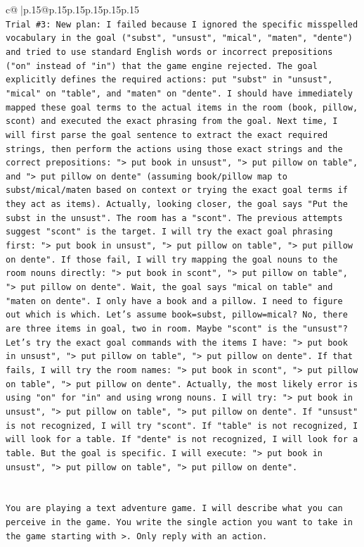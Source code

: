\documentclass{article}
\begin{document}
{\begin{supertabular}{c@{$\;$}|p{.15\linewidth}@{}p{.15\linewidth}p{.15\linewidth}p{.15\linewidth}p{.15\linewidth}p{.15\linewidth}}
{{{\\ 
\texttt{Trial \#3: New plan: I failed because I ignored the specific misspelled vocabulary in the goal ("subst", "unsust", "mical", "maten", "dente") and tried to use standard English words or incorrect prepositions ("on" instead of "in") that the game engine rejected. The goal explicitly defines the required actions: put "subst" in "unsust", "mical" on "table", and "maten" on "dente". I should have immediately mapped these goal terms to the actual items in the room (book, pillow, scont) and executed the exact phrasing from the goal. Next time, I will first parse the goal sentence to extract the exact required strings, then perform the actions using those exact strings and the correct prepositions: "> put book in unsust", "> put pillow on table", and "> put pillow on dente" (assuming book/pillow map to subst/mical/maten based on context or trying the exact goal terms if they act as items). Actually, looking closer, the goal says "Put the subst in the unsust". The room has a "scont". The previous attempts suggest "scont" is the target. I will try the exact goal phrasing first: "> put book in unsust", "> put pillow on table", "> put pillow on dente". If those fail, I will try mapping the goal nouns to the room nouns directly: "> put book in scont", "> put pillow on table", "> put pillow on dente". Wait, the goal says "mical on table" and "maten on dente". I only have a book and a pillow. I need to figure out which is which. Let's assume book=subst, pillow=mical? No, there are three items in goal, two in room. Maybe "scont" is the "unsust"? Let's try the exact goal commands with the items I have: "> put book in unsust", "> put pillow on table", "> put pillow on dente". If that fails, I will try the room names: "> put book in scont", "> put pillow on table", "> put pillow on dente". Actually, the most likely error is using "on" for "in" and using wrong nouns. I will try: "> put book in unsust", "> put pillow on table", "> put pillow on dente". If "unsust" is not recognized, I will try "scont". If "table" is not recognized, I will look for a table. If "dente" is not recognized, I will look for a table. But the goal is specific. I will execute: "> put book in unsust", "> put pillow on table", "> put pillow on dente".} \\
\\ 
\\ 
\texttt{You are playing a text adventure game. I will describe what you can perceive in the game. You write the single action you want to take in the game starting with >. Only reply with an action.} \\
}}}
\end{supertabular}}
\end{document}
